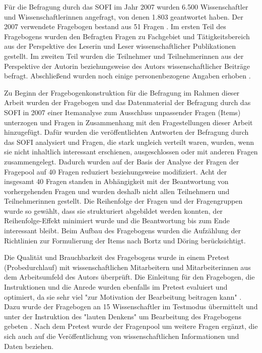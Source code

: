 Für die Befragung durch das SOFI im Jahr 2007 wurden 6.500 Wissenschaftler und Wissenschaftlerinnen angefragt, von denen 1.803 geantwortet haben. Der 2007 verwendete Fragebogen bestand aus 51 Fragen  \cite{Hanekop_Wittke_2007_Fragebogen}. Im ersten Teil des Fragebogens wurden den Befragten Fragen zu Fachgebiet und Tätigkeitsbereich aus der Perspektive des Leserin und Leser wissenschaftlicher Publikationen gestellt. Im zweiten Teil wurden die Teilnehmer und Teilnehmerinnen aus der Perspektive der Autorin beziehungsweise des Autors wissenschaftlicher Beiträge befragt. Abschließend wurden noch einige personenbezogene Angaben erhoben \cite{Hanekop_Wittke_2007_Fragebogen}.

Zu Beginn der Fragebogenkonstruktion für die Befragung im Rahmen dieser Arbeit wurden der Fragebogen und das Datenmaterial der Befragung durch das SOFI in 2007 einer Itemanalyse zum Ausschluss unpassender Fragen (Items) unterzogen und Fragen in Zusammenhang mit den Fragestellungen dieser Arbeit hinzugefügt. Dafür wurden die veröffentlichten Antworten der Befragung durch das SOFI analysiert \cite{Hanekop_Wittke_2007_Fragebogen} und Fragen, die stark ungleich verteilt waren, wurden, wenn sie nicht inhaltlich interessant erschienen, ausgeschlossen oder mit anderen Fragen zusammengelegt. Dadurch wurden auf der Basis der Analyse der Fragen der Fragepool auf 40 Fragen reduziert beziehungsweise modifiziert. Acht der insgesamt 40 Fragen standen in Abhängigkeit mit der Beantwortung von vorhergehenden Fragen und wurden deshalb nicht allen Teilnehmern und Teilnehmerinnen gestellt. Die Reihenfolge der Fragen und der Fragengruppen wurde so gewählt, dass sie strukturiert abgebildet werden konnten, der Reihenfolge-Effekt minimiert wurde und die Beantwortung bis zum Ende interessant bleibt. Beim Aufbau des Fragebogens wurden die Aufzählung der Richtlinien zur Formulierung der Items nach Bortz und Döring \cite{raab_2012_fragebogen} berücksichtigt.

Die Qualität und Brauchbarkeit des Fragebogens wurde in einem Pretest (Probedurchlauf) mit wissenschaftlichen Mitarbeitern und Mitarbeiterinnen aus dem Arbeitsumfeld des Autors überprüft. Die Einleitung für den Fragebogen, die Instruktionen und die Anrede wurden ebenfalls im Pretest evaluiert und optimiert, da sie sehr viel "zur Motivation der Bearbeitung beitragen kann" \cite{raab_2012_fragebogen}. Dazu wurde der Fragebogen an 15 Wissenschaftler im Testmodus übermittelt und unter der Instruktion des "lauten Denkens" um Bearbeitung des Fragebogens gebeten \cite{raab_2012_fragebogen}. Nach dem Pretest wurde der Fragenpool um weitere Fragen ergänzt, die sich auch auf die Veröffentlichung von wissenschaftlichen Informationen und Daten beziehen.

